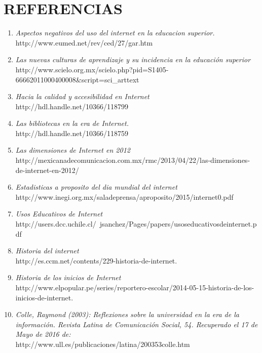 \documentclass{bmcart}
\begin{document}
\section*{REFERENCIAS}
	\begin{enumerate}
		\item \textit{ Aspectos negativos del uso del internet en la educacion superior.}\\
		http://www.eumed.net/rev/ced/27/gar.htm
		\item \textit{Las nuevas culturas de aprendizaje y su incidencia en la educación superior}\\
		http://www.scielo.org.mx/scielo.php?pid=S1405-66662011000400008\&script=sci\_arttext
		
		\item  \textit{Hacia la calidad y accesibilidad en Internet}\\
		http://hdl.handle.net/10366/118799
		
		\item \textit{Las bibliotecas en la era de Internet.}\\
		http://hdl.handle.net/10366/118759
		
		\item \textit{Las dimensiones de Internet en 2012}\\
			http://mexicanadecomunicacion.com.mx/rmc/2013/04/22/las-dimensiones-de-internet-en-2012/
		\item 	 \textit{Estadisticas a proposito del dia mundial del internet}\\
			http://www.inegi.org.mx/saladeprensa/aproposito/2015/internet0.pdf
			\item 	 \textit{Usos Educativos de Internet}
			http://users.dcc.uchile.cl/~jsanchez/Pages/papers/usoseducativosdeinternet.pdf
			\item 	\textit{ Historia del internet}\\
			http://es.ccm.net/contents/229-historia-de-internet.
			\item \textit{Historia de los inicios de Internet}\\
			http://www.elpopular.pe/series/reportero-escolar/2014-05-15-historia-de-los-inicios-de-internet.
			\item 	\textit{Colle, Raymond (2003): Reflexiones sobre la universidad en la era de la información. Revista Latina de Comunicación Social, 54. Recuperado el 17 de Mayo de 2016 de:}\\
			http://www.ull.es/publicaciones/latina/200353colle.htm 
			
	\end{enumerate}   
	 
\end{document}
